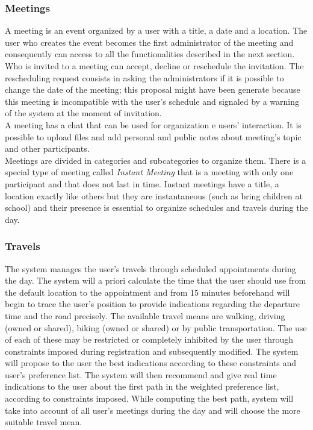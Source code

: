 
\subsubsection{Meetings}
A meeting is an event organized by a user with a title, a date and a location. The user who creates the event becomes the first administrator of the meeting and consequently can access to all the functionalities described in the next section. Who is invited to a meeting can accept, decline or reschedule the invitation. The rescheduling request consists in asking the administrators if it is possible to change the date of the meeting; this proposal might have been generate because this meeting is incompatible with the user's schedule and signaled by a warning of the system at the moment of invitation. \\
A meeting has a chat that can be used for organization e users' interaction. It is possible to upload files and add personal and public notes about meeting's topic and other participants.\\
Meetings are divided in categories and subcategories to organize them. There is a special type of meeting called \textit{Instant Meeting }that is a meeting with only one participant and that does not last in time. Instant meetings have a title, a location exactly like others but they are instantaneous (such as bring children at school) and their presence is essential to organize schedules and travels during the day.
	
\subsubsection{Travels} 

The system manages the user's travels through scheduled appointments during the day. The system will a priori calculate the time that the user should use from the default location to the appointment and from 15 minutes beforehand will begin to trace the user's position to provide indications regarding the departure time and the road precisely. The available travel means are walking, driving (owned or shared), biking (owned or shared) or by public transportation.  The use of each of these may be restricted or completely inhibited by the user through constraints imposed during registration and subsequently modified. The system will propose to the user the best indications according to these constraints and user's preference list. The system will then recommend and give real time indications to the user about the first path in the weighted preference list, according to constraints imposed. While computing the best path, system will take into account of all user's meetings during the day and will choose the more suitable travel mean.
